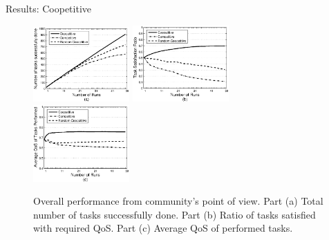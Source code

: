\documentclass{beamer}
\begin{document}
\begin{frame}{Results: Coopetitive}
    \begin{figure}[h]
        \centering
        \includegraphics[width=1.45in]{figures/graphtaskdone.eps}
        \includegraphics[width=1.45in]{figures/graphtasksatisfaction.eps}
        \includegraphics[width=1.45in]{figures/graphavgqostask.eps}
        \caption{Overall performance from community's point of view. Part
        (a) Total number of tasks successfully done. Part (b) Ratio of
        tasks satisfied with required QoS. Part (c) Average QoS of
        performed tasks.} \label{graph_task}
    \end{figure}
\end{frame}

\end{document}
